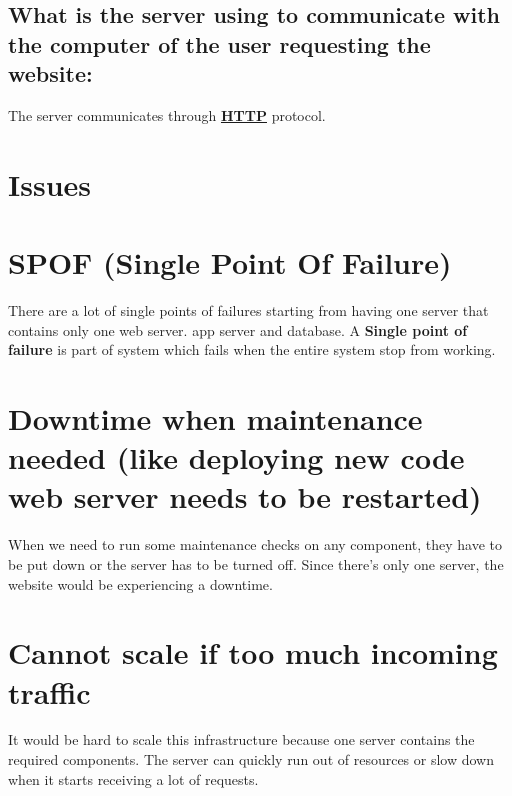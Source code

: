 \documentclass[a4paper, 10pt]{article}
\begin{document}
    \subsection*{What is the server using to communicate with
                    the computer of the user requesting the website: }
        The server communicates through \textbf{\underline{HTTP}} protocol.

\section{Issues}
    \section*{SPOF (Single Point Of Failure)}
        There are a lot of single points of failures starting from
        having one server that contains only one web server. app server
        and database. A \textbf{Single point of failure} is part of system which fails
        when the entire system stop from working.
    \section*{Downtime when maintenance
                needed (like deploying new code web server needs to be restarted)}
                When we need to run some maintenance checks on any component,
                they have to be put down or the server has to be turned off.
                Since there's only one server, the website would be experiencing a downtime.
    \section*{Cannot scale if too much incoming traffic}
    It would be hard to scale this infrastructure
    because one server contains the required components.
    The server can quickly run out of resources or slow down when it starts receiving a lot of requests.
\end{document}
